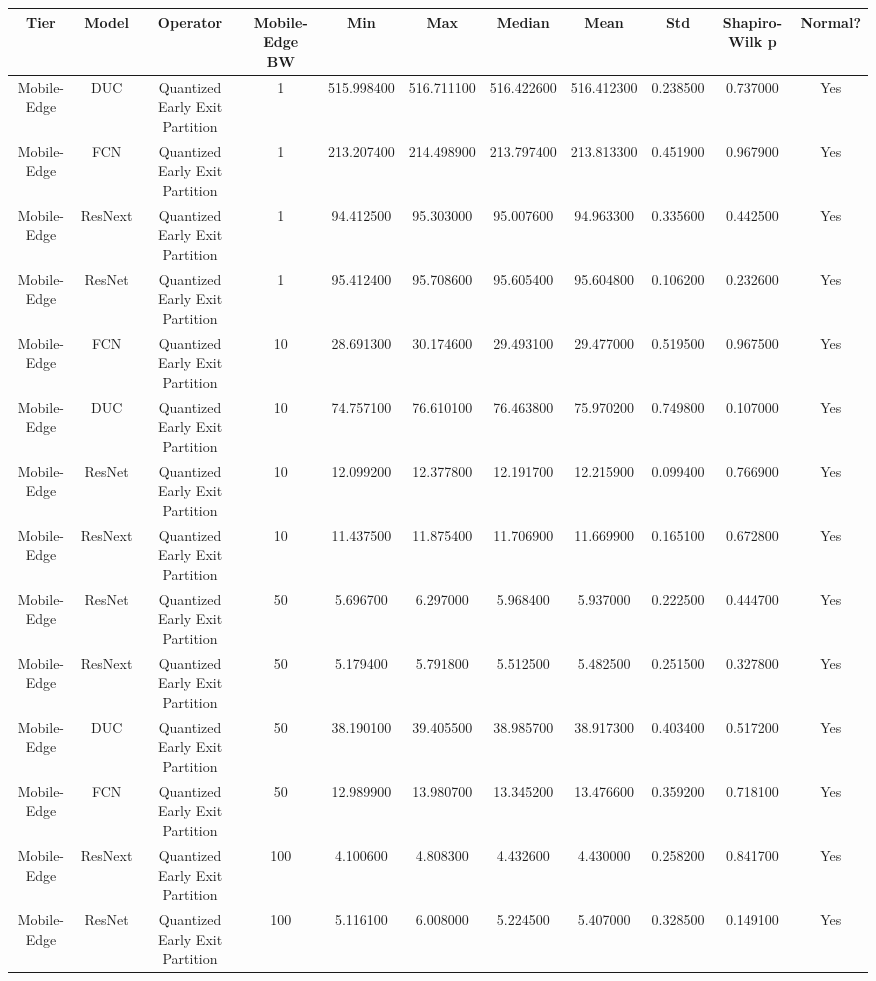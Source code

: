 \begin{tabular}{|c||c||c||c||c||c||c||c||c||c||c|}
\toprule
Tier & Model & Operator & Mobile-Edge BW & Min & Max & Median & Mean & Std & Shapiro-Wilk p & Normal? \\
\midrule
Mobile-Edge & DUC & Quantized Early Exit Partition & 1 & 515.998400 & 516.711100 & 516.422600 & 516.412300 & 0.238500 & 0.737000 & Yes \\
Mobile-Edge & FCN & Quantized Early Exit Partition & 1 & 213.207400 & 214.498900 & 213.797400 & 213.813300 & 0.451900 & 0.967900 & Yes \\
Mobile-Edge & ResNext & Quantized Early Exit Partition & 1 & 94.412500 & 95.303000 & 95.007600 & 94.963300 & 0.335600 & 0.442500 & Yes \\
Mobile-Edge & ResNet & Quantized Early Exit Partition & 1 & 95.412400 & 95.708600 & 95.605400 & 95.604800 & 0.106200 & 0.232600 & Yes \\
Mobile-Edge & FCN & Quantized Early Exit Partition & 10 & 28.691300 & 30.174600 & 29.493100 & 29.477000 & 0.519500 & 0.967500 & Yes \\
Mobile-Edge & DUC & Quantized Early Exit Partition & 10 & 74.757100 & 76.610100 & 76.463800 & 75.970200 & 0.749800 & 0.107000 & Yes \\
Mobile-Edge & ResNet & Quantized Early Exit Partition & 10 & 12.099200 & 12.377800 & 12.191700 & 12.215900 & 0.099400 & 0.766900 & Yes \\
Mobile-Edge & ResNext & Quantized Early Exit Partition & 10 & 11.437500 & 11.875400 & 11.706900 & 11.669900 & 0.165100 & 0.672800 & Yes \\
Mobile-Edge & ResNet & Quantized Early Exit Partition & 50 & 5.696700 & 6.297000 & 5.968400 & 5.937000 & 0.222500 & 0.444700 & Yes \\
Mobile-Edge & ResNext & Quantized Early Exit Partition & 50 & 5.179400 & 5.791800 & 5.512500 & 5.482500 & 0.251500 & 0.327800 & Yes \\
Mobile-Edge & DUC & Quantized Early Exit Partition & 50 & 38.190100 & 39.405500 & 38.985700 & 38.917300 & 0.403400 & 0.517200 & Yes \\
Mobile-Edge & FCN & Quantized Early Exit Partition & 50 & 12.989900 & 13.980700 & 13.345200 & 13.476600 & 0.359200 & 0.718100 & Yes \\
Mobile-Edge & ResNext & Quantized Early Exit Partition & 100 & 4.100600 & 4.808300 & 4.432600 & 4.430000 & 0.258200 & 0.841700 & Yes \\
Mobile-Edge & ResNet & Quantized Early Exit Partition & 100 & 5.116100 & 6.008000 & 5.224500 & 5.407000 & 0.328500 & 0.149100 & Yes \\

\end{tabular}
